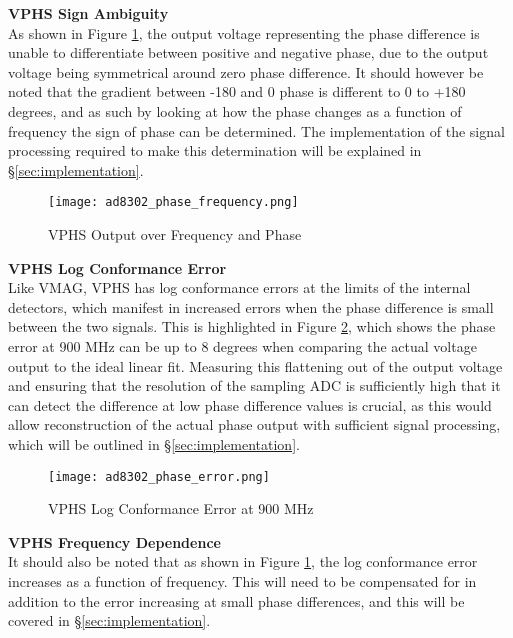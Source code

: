 \textbf{VPHS Sign Ambiguity} \\
As shown in Figure \ref{fig:ad8302_VPHS_frequency}, the output voltage representing the phase difference is unable to differentiate between positive and negative phase, due to the output voltage being symmetrical around zero phase difference. It should however be noted that the gradient between -180 and 0 phase is different to 0 to +180 degrees, and as such by looking at how the phase changes as a function of frequency the sign of phase can be determined. The implementation of the signal processing required to make this determination will be explained in \S \ref{sec:implementation}. 
\begin{figure}[H]
	\centering
	\texttt{[image: ad8302\_phase\_frequency.png]}
	\caption{VPHS Output over Frequency and Phase}
	\label{fig:ad8302_VPHS_frequency}
\end{figure}

\newpage
\textbf{VPHS Log Conformance Error}\\
Like VMAG, VPHS has log conformance errors at the limits of the internal detectors, which manifest in increased errors when the phase difference is small between the two signals. This is highlighted in Figure \ref{fig:ad8302_VPHS_conformance}, which shows the phase error at 900 MHz can be up to 8 degrees when comparing the actual voltage output to the ideal linear fit. Measuring this flattening out of the output voltage and ensuring that the resolution of the sampling ADC is sufficiently high that it can detect the difference at low phase difference values is crucial, as this would allow reconstruction of the actual phase output with sufficient signal processing, which will be outlined in \S \ref{sec:implementation}. 
\begin{figure}[H]
	\centering
	\texttt{[image: ad8302\_phase\_error.png]}
	\caption{VPHS Log Conformance Error at 900 MHz}
	\label{fig:ad8302_VPHS_conformance}
\end{figure}

\textbf{VPHS Frequency Dependence} \\
It should also be noted that as shown in Figure \ref{fig:ad8302_VPHS_frequency}, the log conformance error increases as a function of frequency. This will need to be compensated for in addition to the error increasing at small phase differences, and this will be covered in \S \ref{sec:implementation}. 

